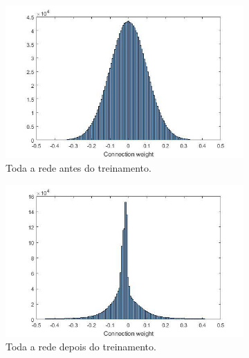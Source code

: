 \documentclass{article}
\begin{document}
            \begin{figure}[h!]
                \begin{subfigure}{0.5\textwidth}
                    \centering
                    \includegraphics[scale=.3]{Images/Weights distribution.png}
                    \caption{Toda a rede antes do treinamento.}
                \end{subfigure}
                \begin{subfigure}{0.5\textwidth}
                    \centering
                    \includegraphics[scale=0.3]{Images/Weights distribution (2).png}
                    \caption{Toda a rede depois do treinamento.}
                \end{subfigure}
                \begin{subfigure}{0.5\textwidth}
                    \centering

\end{subfigure}
\end{figure}
\end{document}

